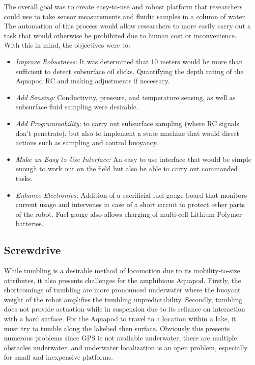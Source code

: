 The overall goal was to create easy-to-use and robust platform that researchers could use to take sensor measurements and fluidic samples in a column of water. The automation of this process would allow researchers to more easily carry out a task that would otherwise be prohibited due to human cost or inconvenience. With this in mind, the objectives were to: 

\begin{itemize}
	\item \emph{Improve Robustness:} It was determined that 10 meters would be more than sufficient to detect subsurface oil slicks. Quantifying the depth rating of the Aquapod RC and making adjustments if necessary. 
	\item \emph{Add Sensing:} Conductivity, pressure, and temperature sensing, as well as subsurface fluid sampling were desirable. 
	\item \emph{Add Programmability:} to carry out subsurface sampling (where RC signals don't penetrate), but also to implement a state machine that would direct actions such as sampling and control buoyancy.
	\item \emph{Make an Easy to Use Interface:} An easy to use interface that would be simple enough to work out on the field but also be able to carry out commanded tasks. 
	\item \emph{Enhance Electronics:} Addition of a sacrificial fuel gauge board that monitors current usage and intervenes in case of a short circuit to protect other parts of the robot. Fuel gauge also allows charging of multi-cell Lithium Polymer batteries. 
\end{itemize}


\subsection{Screwdrive}

While tumbling is a desirable method of locomotion due to its mobility-to-size attributes, it also presents challenges for the amphibious Aquapod. Firstly, the shortcomings of tumbling are more pronounced underwater where the buoyant weight of the robot amplifies the tumbling unpredictability. Secondly, tumbling does not provide actuation while in suspension due to its reliance on interaction with a hard surface. For the Aquapod to travel to a location within a lake, it must try to tumble along the lakebed then surface. Obviously this presents numerous problems since GPS is not available underwater, there are multiple obstacles underwater, and underwater localization is an open problem, especially for small and inexpensive platforms.

